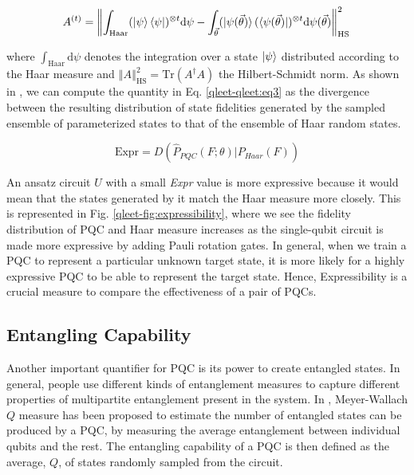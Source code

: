 \begin{equation}\label{qleet-qleet:eq3}
A^{(t)}=\left\Vert \int_\text{Haar}(\ket{\psi}\bra{\psi})^{\otimes t} \text{d}\psi-\int_{\vec{\theta}}(\ket{\psi(\vec{\theta})}(\bra{\psi(\vec{\theta})})^{\otimes t} \text{d}\psi(\vec{\theta}) \right\Vert_\text{HS}^2\,
\end{equation}

where $\int_\text{Haar}\text{d}\psi$ denotes the integration over a state $\ket{\psi}$ distributed according to the Haar measure and $\left\Vert A \right\Vert_\text{HS}^2=\text{Tr}(A^\dagger A)$ the Hilbert-Schmidt norm. As shown in \cite{expressibility-entanglability-guzik}, we can compute the quantity in Eq. \ref{qleet-qleet:eq3} as the divergence between the resulting distribution of state fidelities generated by the sampled ensemble of parameterized states to that of the ensemble of Haar random states.

\begin{equation}
    \text{Expr} = D(\hat{P}_{PQC}(F; \theta) | P_{Haar}(F))
\end{equation}

An ansatz circuit $U$ with a small \textit{Expr} value is more expressive because it would mean that the states generated by it match the Haar measure more closely. This is represented in Fig. \ref{qleet-fig:expressibility}, where we see the fidelity distribution of PQC and Haar measure increases as the single-qubit circuit is made more expressive by adding Pauli rotation gates. In general, when we train a PQC to represent a particular unknown target state, it is more likely for a highly expressive PQC to be able to represent the target state. Hence, Expressibility is a crucial measure to compare the effectiveness of a pair of PQCs. 

\subsection{Entangling Capability}

Another important quantifier for PQC is its power to create entangled states. In general, people use different kinds of entanglement measures to capture different properties of multipartite entanglement present in the system. In \cite{expressibility-entanglability-guzik}, Meyer-Wallach $Q$ measure \cite{doi:10.1063/1.1497700} has been proposed to estimate the number of entangled states can be produced by a PQC, by measuring the average entanglement between individual qubits and the rest. The entangling capability of a PQC is then defined as the average, $Q$, of states randomly sampled from the circuit.


